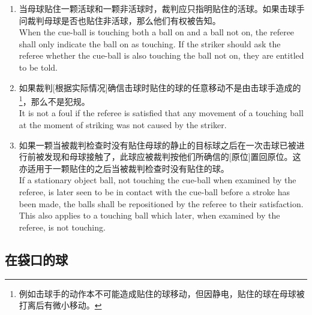 \begin{enumerate}[label=(\alph*)]
    \item 当母球贴住一颗活球和一颗非活球时，裁判应只指明贴住的活球。如果击球手问裁判母球是否也贴住非活球，那么他们有权被告知。\\
    When the cue-ball is touching both a ball on and a ball not on, the referee shall only indicate the ball on as touching. If the striker should ask the referee whether the cue-ball is also touching the ball not on, they are entitled to be told.
    \item 如果裁判[根据实际情况]确信击球时贴住的球的任意移动不是由击球手造成的\footnote{例如击球手的动作本不可能造成贴住的球移动，但因静电，贴住的球在母球被打离后有微小移动。}，那么不是犯规。\\
    It is not a foul if the referee is satisfied that any movement of a touching ball at the moment of striking was not caused by the striker.
    \item 如果一颗当被裁判检查时没有贴住母球的静止的目标球之后在一次击球已被进行前被发现和母球接触了，此球应被裁判按他们所确信的[原位]置回原位。这亦适用于一颗贴住的之后当被裁判检查时没有贴住的球。\\
    If a stationary object ball, not touching the cue-ball when examined by the referee, is later seen to be in contact with the cue-ball before a stroke has been made, the balls shall be repositioned by the referee to their satisfaction. This also applies to a touching ball which later, when examined by the referee, is not touching.
\end{enumerate}

\subsection{在袋口的球}\label{2239}

